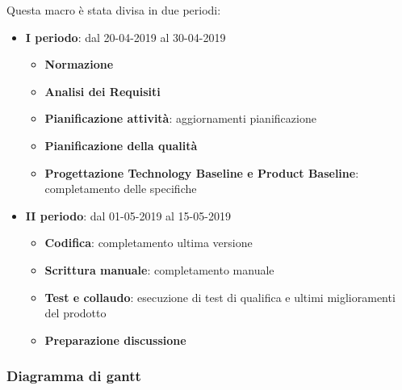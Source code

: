         Questa macro è stata divisa in due periodi:
		\begin{itemize}
			\item \textbf{I periodo}: dal 20-04-2019 al 30-04-2019
			\begin{itemize}
    	        \item \textbf{Normazione}
    	        \item \textbf{Analisi dei Requisiti}
    	        \item \textbf{Pianificazione attività}: aggiornamenti pianificazione
    	        \item \textbf{Pianificazione della qualità}
    	        \item \textbf{Progettazione Technology Baseline e Product Baseline}: completamento delle specifiche
        	\end{itemize}
			\item \textbf{II periodo}: dal 01-05-2019 al 15-05-2019
			\begin{itemize}
    	        \item \textbf{Codifica}: completamento ultima versione
    	        \item \textbf{Scrittura manuale}: completamento manuale
    	        \item \textbf{Test e collaudo}: esecuzione di test di qualifica e ultimi miglioramenti del prodotto
    	        \item \textbf{Preparazione discussione}
        	\end{itemize}
		\end{itemize}
        
        
            \subsubsection{Diagramma di gantt}
